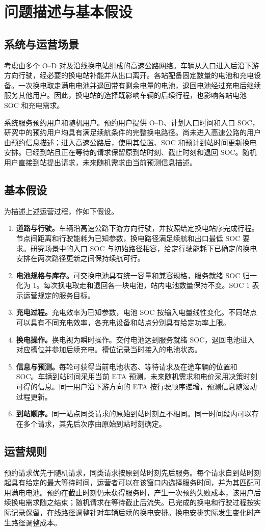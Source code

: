 \section{问题描述与基本假设}

\subsection{系统与运营场景}
考虑由多个 O--D 对及沿线换电站组成的高速公路网络。车辆从入口进入后沿下游方向行驶，经必要的换电站补能并从出口离开。各站配备固定数量的电池和充电设备。一次换电取走满电电池并退回带有剩余电量的电池，退回电池经过充电后继续服务其他用户。因此，换电站的选择既影响车辆的后续行程，也影响各站电池 SOC 和充电需求。

系统服务预约用户和随机用户。预约用户提供 O--D、计划入口时间和入口 SOC，研究中的预约用户均具有满足续航条件的完整换电路径。尚未进入高速公路的用户由预约信息描述；进入高速公路后，使用其位置、SOC 和预计到站时间更新换电安排。已经到站且正在等待的请求保留原到站时刻、截止时刻和退回 SOC。随机用户直接到站提出请求，未来随机需求由当前预测信息描述。

\subsection{基本假设}
为描述上述运营过程，作如下假设。
\begin{enumerate}[label=\textbf{假设\arabic*.},leftmargin=4.4em]
  \item \textbf{道路与行驶。}车辆沿高速公路下游方向行驶，并按照给定换电站序完成行程。节点间距离和行驶能耗为已知参数，换电路径满足续航和出口最低 SOC 要求。研究场景中的入口 SOC 与初始路径相容，给定行驶能耗下已确定的换电安排在两次路径更新之间保持续航可行。
  \item \textbf{电池规格与库存。}可交换电池具有统一容量和兼容规格，服务就绪 SOC 归一化为 $1$。每次换电取走和退回各一块电池，站内电池数量保持不变。SOC $1$ 表示运营规定的服务目标。
  \item \textbf{充电过程。}充电效率为已知参数，电池 SOC 按输入电量线性变化。不同站点可以具有不同充电效率，各充电设备和站点分别具有给定功率上限。
  \item \textbf{换电操作。}换电视为瞬时操作。交付电池达到服务就绪 SOC，退回电池进入对应槽位并参加后续充电。槽位记录当时接入的电池状态。
  \item \textbf{信息与预测。}每轮可获得当前电池状态、等待请求及在途车辆的位置和 SOC。车辆到站时间采用当前 ETA 预测，未来随机需求和电价采用决策时刻可得的信息。同一用户沿下游方向的 ETA 按行驶顺序递增，预测信息随滚动过程更新。
  \item \textbf{到站顺序。}同一站点同类请求的原始到站时刻互不相同。同一时间段内可以存在多个请求，其先后次序由原始到站时刻确定。
\end{enumerate}

\subsection{运营规则}
预约请求优先于随机请求，同类请求按原到站时刻先后服务。每个请求自到站时刻起具有给定的最大等待时间，运营者可以在该窗口内选择服务时间，并为其匹配可用满电电池。预约在截止时刻仍未获得服务时，产生一次预约失败成本，该用户后续换电需求随之结束；随机请求在等待截止后流失。已完成的换电和行驶过程按实际记录保留，在线路径调整针对车辆后续的换电安排。换电安排实际发生变化时产生路径调整成本。

